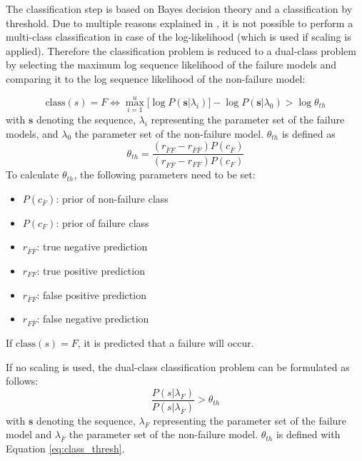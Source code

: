 \documentclass[mscthesis]{usiinfthesis}
\begin{document}
The classification step is based on Bayes decision theory and a classification
by threshold. Due to multiple reasons explained in \cite{salfner08}, it is not
possible to perform a multi-class classification in case of the log-likelihood
(which is used if scaling is applied). Therefore the classification problem is
reduced to a dual-class problem by selecting the maximum log sequence
likelihood of the failure models and comparing it to the log sequence
likelihood of the non-failure model:

\begin{equation}
    \label{eq:class}
    \text{class}(s) = F \iff \max_{i=1}^{u} \big [
        \log P(\boldsymbol{s}|\lambda_i)
    \big ] - \log P(\boldsymbol{s}|\lambda_0) > \log \theta_{th}
\end{equation}
with $\boldsymbol{s}$ denoting the sequence, $\lambda_i$ representing the
parameter set of the failure models, and $\lambda_0$ the parameter set of the
non-failure model. $\theta_{th}$ is defined as
\begin{equation}
    \label{eq:class_thresh}
    \theta_{th} = \frac{(r_{\bar{F}F} - r_{\bar{F}\bar{F}})P(c_{\bar{F}})}
        {(r_{F \bar{F}} - r_{FF})P(c_{F})}
\end{equation}
To calculate $\theta_{th}$, the following parameters need to be set:
\begin{itemize}
    \item $ P(c_{\bar{F}}) $: prior of non-failure class
    \item $ P(c_F) $: prior of failure class
    \item $ r_{\bar{F}\bar{F}} $: true negative prediction
    \item $ r_{FF} $: true positive prediction
    \item $ r_{\bar{F}F} $: false positive prediction
    \item $ r_{F\bar{F}} $: false negative prediction
\end{itemize}
If $\text{class}(s) = F$, it is predicted that a failure will occur.

If no scaling is used, the dual-class classification problem can be formulated
as follows:
\begin{equation}
    \label{eq:class_ns}
    \frac{P(s|\lambda_F)}{P(s|\lambda_{\bar{F}})} > \theta_{th}
\end{equation}
with $\boldsymbol{s}$ denoting the sequence, $\lambda_F$ representing the
parameter set of the failure model and $\lambda_{\bar{F}}$ the parameter set of
the non-failure model. $\theta_{th}$ is defined with Equation \ref{eq:class_thresh}.
\end{document}
